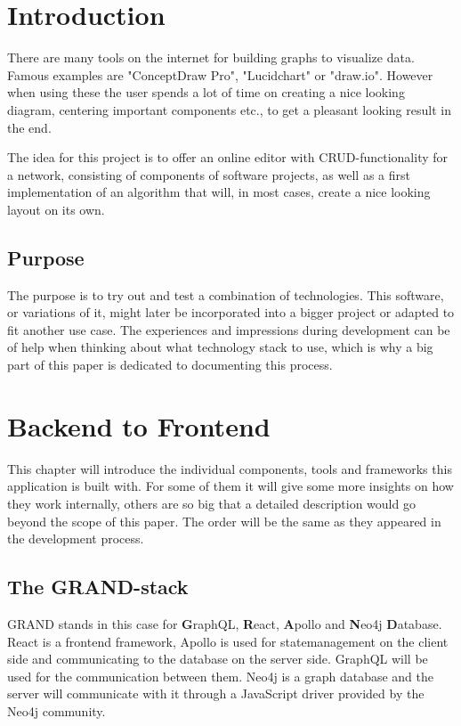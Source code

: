\chapter{Introduction}
\label{chap:Intro}
There are many tools on the internet for building graphs to visualize data. Famous examples are "ConceptDraw Pro", "Lucidchart" \cite{JeffParker} or "draw.io". However when using these the user spends a lot of time on creating a nice looking diagram, centering important components etc., to get a pleasant looking result in the end.

The idea for this project is to offer an online editor with CRUD-functionality for a network, consisting of components of software projects, as well as a first implementation of an algorithm that will, in most cases, create a nice looking layout on its own.

\section{Purpose}
The purpose is to try out and test a combination of technologies. This software, or variations of it, might later be incorporated into a bigger project or adapted to fit another use case. The experiences and impressions during development can be of help when thinking about what technology stack to use, which is why a big part of this paper is dedicated to documenting this process.

\chapter{Backend to Frontend}

This chapter will introduce the individual components, tools and frameworks this application is built with. For some of them it will give some more insights on how they work internally, others are so big that a detailed description would go beyond the scope of this paper. The order will be the same as they appeared in the development process.

\section{The GRAND-stack}
GRAND stands in this case for \textbf{G}raphQL, \textbf{R}eact, \textbf{A}pollo and \textbf{N}eo4j \textbf{D}atabase. \cite{GrandStackGettingStarted} React is a frontend framework, Apollo is used for statemanagement on the client side and communicating to the database on the server side. GraphQL will be used for the communication between them. Neo4j is a graph database and the server will communicate with it through a JavaScript driver provided by the Neo4j community.


